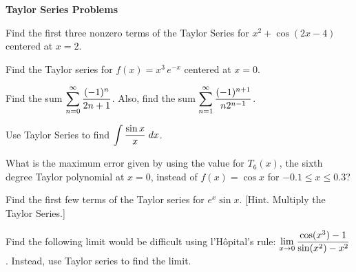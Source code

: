 \documentclass[11pt,letterpaper]{article}
\begin{document}
\begin{center} {\bfseries \LARGE Taylor Series Problems} \end{center} \pspace

\prob Find the first three nonzero terms of the Taylor Series for $x^2 + \cos(2x - 4)$ centered at $x= 2$. \vfill

\prob Find the Taylor series for $f(x)= x^3 \, e^{-x}$ centered at $x= 0$. \vfill



\newpage



\prob Find the sum $\displaystyle\sum_{n= 0}^\infty \dfrac{(-1)^n}{2n + 1}$. Also, find the sum $\displaystyle\sum_{n=1}^\infty \dfrac{(-1)^{n+1}}{n 2^{n - 1}}$. \vfill

\prob Use Taylor Series to find $\displaystyle\int \dfrac{\sin x}{x} \;dx$. \vfill



\newpage



\prob What is the maximum error given by using the value for $T_6(x)$, the sixth degree Taylor polynomial at $x= 0$, instead of $f(x)= \cos x$ for $-0.1 \leq x \leq 0.3$? \vfill

\prob Find the first few terms of the Taylor series for $e^x \sin x$. [Hint. Multiply the Taylor Series.] \vfill



\newpage

\prob Find the following limit would be difficult using l'H\^{o}pital's rule: $\displaystyle\lim_{x \to 0} \dfrac{\cos(x^3) - 1}{\sin(x^2) - x^2}$. Instead, use Taylor series to find the limit. \vfill
\end{document}
